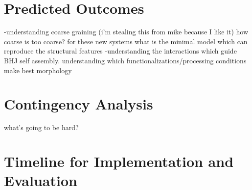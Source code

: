 \section*{Predicted Outcomes}
-understanding coarse graining (i'm stealing this from mike because I like it) how coarse is too coarse? for these new systems what is the minimal model which can reproduce the structural features
-understanding the interactions which guide BHJ self assembly. understanding which functionalizations/processing conditions make best morphology

\section*{Contingency Analysis}
what's going to be hard?

\section*{Timeline for Implementation and Evaluation}

